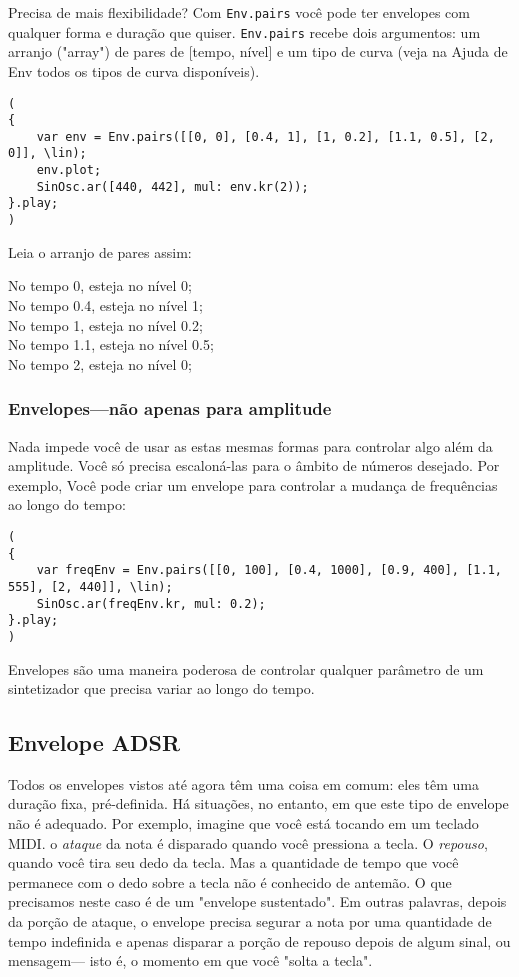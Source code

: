 Precisa de mais flexibilidade? Com \texttt{Env.pairs} você pode ter envelopes com qualquer forma e duração que quiser. \texttt{Env.pairs} recebe dois argumentos: um arranjo ("array") de pares de [tempo, nível] e um tipo de curva (veja na Ajuda de Env todos os tipos de curva disponíveis).

 
\begin{lstlisting}[style=SuperCollider-IDE, basicstyle=\scttfamily\footnotesize]
(
{
	var env = Env.pairs([[0, 0], [0.4, 1], [1, 0.2], [1.1, 0.5], [2, 0]], \lin);
	env.plot;
	SinOsc.ar([440, 442], mul: env.kr(2));
}.play;
)
\end{lstlisting}
 
Leia o arranjo de pares assim:
\begin{center}
No tempo 0, esteja no nível 0;\\
No tempo 0.4, esteja no nível 1;\\
No tempo 1, esteja no nível 0.2;\\
No tempo 1.1, esteja no nível 0.5;\\
No tempo 2, esteja no nível 0;
\end{center}

\subsubsection{Envelopes---não apenas para amplitude}

Nada impede você de usar as estas mesmas formas para controlar algo além da amplitude. Você só precisa escaloná-las para o âmbito de números desejado. Por exemplo, Você pode criar um envelope para controlar a mudança de frequências ao longo do tempo:

\begin{lstlisting}[style=SuperCollider-IDE, basicstyle=\scttfamily\footnotesize]
(
{
	var freqEnv = Env.pairs([[0, 100], [0.4, 1000], [0.9, 400], [1.1, 555], [2, 440]], \lin);
	SinOsc.ar(freqEnv.kr, mul: 0.2);
}.play;
)
\end{lstlisting}

Envelopes são uma maneira poderosa de controlar qualquer parâmetro de um sintetizador que precisa variar ao longo do tempo.

\subsection{Envelope ADSR}

Todos os envelopes vistos até agora têm uma coisa em comum: eles têm uma duração fixa, pré-definida. Há situações, no entanto, em que este tipo de envelope não é adequado. Por exemplo, imagine que você está tocando em um teclado MIDI. o \textit{ataque} da nota é disparado quando você pressiona a tecla. O \textit{repouso}, quando você tira seu dedo da tecla. Mas a quantidade de tempo que você permanece com o dedo sobre a tecla não é conhecido de antemão. O que precisamos neste caso é de um "envelope sustentado". Em outras palavras, depois da porção de ataque, o envelope precisa segurar a nota por uma quantidade de tempo indefinida e apenas disparar a porção de repouso depois de algum sinal, ou mensagem--- isto é, o momento em que você "solta a tecla".

